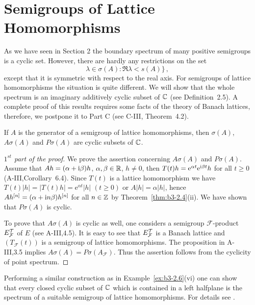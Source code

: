 \section{Semigroups of Lattice Homomorphisms}%
As we have seen in Section 2 the boundary spectrum of many positive semigroups is a cyclic set.
However, there are hardly any restrictions on the set 
\[
\lambda \in \sigma(A) : \Re\lambda < s(A)\}\,,
\] 
except that it is symmetric with respect to the real axis.
For semigroups of lattice homomorphisms the situation is quite different.
We will show that the whole spectrum is an imaginary additively cyclic subset of $\mathbb{C}$ (see Definition~2.5).
A complete proof of this results requires some facts of the theory of Banach lattices, therefore, we postpone it to Part C (see C-III, Theorem~4.2).
\begin{theorem}\label{thm:b3-4.1}
%
	If $A$ is the generator of a semigroup of lattice homomorphisms, then $\sigma(A)$, $A\sigma(A)$ and $P\sigma(A)$ are cyclic subsets of $\mathbb{C}$.
\end{theorem}
\begin{proof}[$1^{st}$ part of the proof]
	We prove the assertion concerning $A\sigma(A)$ and $P\sigma(A)$.
	Assume that $Ah = (\alpha + \mathrm{i}\beta)h$, $\alpha,\beta \in \mathbb{R}$, $h \neq 0$, then $T(t)h = \mathrm{e}^{\alpha t}\mathrm{e}^{\mathrm{i}\beta  t}h$ for all $t \geq 0$ (A-III,Corollary~6.4).
	Since $T(t)$ is a lattice homomorphism we have $T(t)|h| = |T(t)h| = \mathrm{e}^{\alpha t}|h|$ $(t \geq 0)$ or $A|h| = \alpha|h|$, hence $Ah^{[n]} = (\alpha + \mathrm{i} n\beta)h^{[n]}$ for all $n \in \mathbb{Z}$ by Theorem~\ref{thm:b3-2.4}(ii).
	We have shown that $P\sigma(A)$ is cyclic.
	
	To prove that $A\sigma(A)$ is cyclic as well, one considers a semigroup $\mathcal{F}$-product $E_{\mathcal{F}}^{\mathcal{T}}$ of $E$ (see A-III,4.5).
	It is easy to see that $E_{\mathcal{F}}^{\mathcal{T}}$ is a Banach lattice 
	and $(T_{\mathcal{F}}(t))$ is a semigroup of lattice homomorphisms.
	The proposition in A-III,3.5 implies $A\sigma(A) = P\sigma(A_{\mathcal{F}})$.
	Thus the assertion follows from the cyclicity of point spectrum.
\end{proof}
Performing a similar construction as in Example~\ref{ex:b3-2.6}(vi) one can show that every closed cyclic subset of $\mathbb{C}$  which is contained in a left halfplane is the spectrum of a suitable semigroup of lattice homomorphisms. 
For details see \citet{derndingernagel:1979}. 

